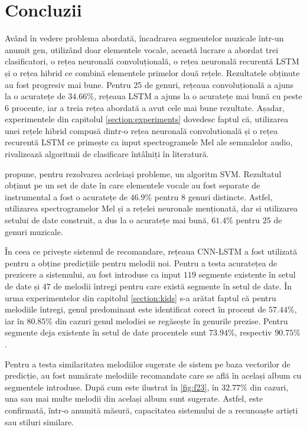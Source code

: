 \chapter*{Concluzii} 
Având în vedere problema abordată, încadrarea segmentelor muzicale într-un anumit gen, utilizând doar elementele vocale, această lucrare a abordat
trei clasificatori, o rețea neuronală convoluțională, o rețea neuronală recurentă LSTM și o rețea hibrid ce combină elementele primelor două rețele.
Rezultatele obținute au fost progresiv mai bune. Pentru 25 de genuri, rețeaua convoluțională a ajuns la o acuratețe de $34.66\%$, rețeaua LSTM a ajuns
la o acuratețe mai bună cu peste $6$ procente, iar a treia rețea abordată a avut cele mai bune rezultate. Așadar, experimentele din capitolul
\ref{section:experiments} dovedesc faptul că, utilizarea unei rețele hibrid compusă dintr-o rețea neuronală convolutională și o rețea recurentă LSTM
ce primește ca input spectrogramele Mel ale semnalelor audio, rivalizează algoritmii de clasificare întâlniți în literatură.

\cite{vocal} propune, pentru rezolvarea aceleiași probleme, un algoritm SVM. Rezultatul obținut pe un set de date în care
elementele vocale au fost separate de instrumental a fost o acuratețe de $46.9\%$ pentru 8 genuri distincte.
Astfel, utilizarea spectrogramelor Mel și a rețelei neuronale menționată, dar si utilizarea setului de date
construit, a dus la o acuratețe mai bună, $61.4\%$ pentru $25$ de genuri muzicale.

În ceea ce privește sistemul de recomandare, rețeaua CNN-LSTM a fost utilizată pentru a obține predicțiile pentru melodii noi. Pentru a testa acuratețea de
prezicere a sistemului,
au fost introduse ca input $119$ segmente existente în setul de date și $47$ de melodii întregi pentru care există segmente în setul de date. În urma
experimentelor din capitolul \ref{section:kids} s-a arătat faptul că pentru melodiile întregi, genul predominant este identificat corect în procent de $57.44\%$, iar
în $80.85\%$ din cazuri genul melodiei se regăsește în genurile prezise. Pentru segmente deja existente în setul de date procentele sunt $73.94\%$, respectiv $90.75\%$.

Pentru a testa similaritatea melodiilor sugerate de sistem pe baza vectorilor de predicție,
au fost numărate melodiile recomandate care se află în același album cu segmentele introduse. După cum este ilustrat în \ref{fig:f23}, în $32.77\%$ din cazuri,
una sau mai multe melodii din același album sunt sugerate. Astfel, este confirmată, într-o anumită măsură, capacitatea sistemului de a recunoaște artiști
sau stiluri similare.


